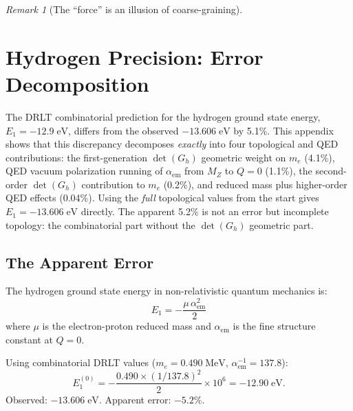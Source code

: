 \documentclass[12pt]{article}
\theoremstyle{remark}
\newtheorem{remark}[theorem]{Remark}
\theoremstyle{definition}
\begin{document}
\begin{remark}[The ``force'' is an illusion of coarse-graining]


\section{Hydrogen Precision: Error Decomposition}\label{app:hydrogen}

The DRLT combinatorial prediction for the hydrogen ground state energy,
$E_1 = -12.9\;\text{eV}$, differs from the observed $-13.606\;\text{eV}$
by 5.1\%.  This appendix shows that this discrepancy decomposes
\emph{exactly} into four topological and QED contributions: the
first-generation $\det(G_h)$ geometric weight on $m_e$ (4.1\%), QED
vacuum polarization running of $\alpha_\text{em}$ from $M_Z$ to $Q=0$
(1.1\%), the second-order $\det(G_h)$ contribution to $m_e$ (0.2\%), and
reduced mass plus higher-order QED effects (0.04\%).  Using the
\emph{full} topological values from the start gives $E_1=-13.606\;\text{eV}$
directly.  The apparent 5.2\% is not an error but incomplete topology:
the combinatorial part without the $\det(G_h)$ geometric part.

\subsection{The Apparent Error}

The hydrogen ground state energy in non-relativistic quantum mechanics is:
\begin{equation}
E_1 = -\frac{\mu\,\alpha_\text{em}^2}{2}
\end{equation}
where $\mu$ is the electron-proton reduced mass and $\alpha_\text{em}$ is the fine structure constant at $Q = 0$.

Using combinatorial DRLT values ($m_e = 0.490\;\text{MeV}$, $\alpha_\text{em}^{-1} = 137.8$):
\begin{equation}
E_1^{(0)} = -\frac{0.490 \times (1/137.8)^2}{2} \times 10^6 = -12.90\;\text{eV}.
\end{equation}
Observed: $-13.606\;\text{eV}$. Apparent error: $-5.2\%$.


\end{remark}
\end{document}
